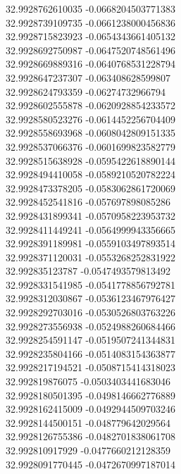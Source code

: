{32.9928762610035	-0.0668204503771383\\
32.9928739109735	-0.0661238000456836\\
32.9928715823923	-0.0654343661405132\\
32.9928692750987	-0.0647520748561496\\
32.9928669889316	-0.0640768531228794\\
32.9928647237307	-0.063408628599807\\
32.9928624793359	-0.06274732966794\\
32.9928602555878	-0.0620928854233572\\
32.9928580523276	-0.0614452256704409\\
32.9928558693968	-0.0608042809151335\\
32.9928537066376	-0.0601699823582779\\
32.9928515638928	-0.0595422618890144\\
32.9928494410058	-0.0589210520782224\\
32.9928473378205	-0.0583062861720069\\
32.9928452541816	-0.057697898085286\\
32.9928431899341	-0.0570958223953732\\
32.9928411449241	-0.0564999943356665\\
32.9928391189981	-0.0559103497893514\\
32.9928371120031	-0.0553268252831922\\
32.992835123787	-0.0547493579813492\\
32.9928331541985	-0.0541778856792781\\
32.9928312030867	-0.0536123467976427\\
32.9928292703016	-0.0530526803763226\\
32.9928273556938	-0.0524988260684466\\
32.9928254591147	-0.0519507241344831\\
32.9928235804166	-0.0514083154363877\\
32.9928217194521	-0.0508715414318023\\
32.992819876075	-0.0503403441683046\\
32.9928180501395	-0.0498146662776889\\
32.9928162415009	-0.0492944509703246\\
32.9928144500151	-0.048779642029564\\
32.9928126755386	-0.0482701838061708\\
32.992810917929	-0.0477660212128359\\
32.9928091770445	-0.0472670997187014\\
}
